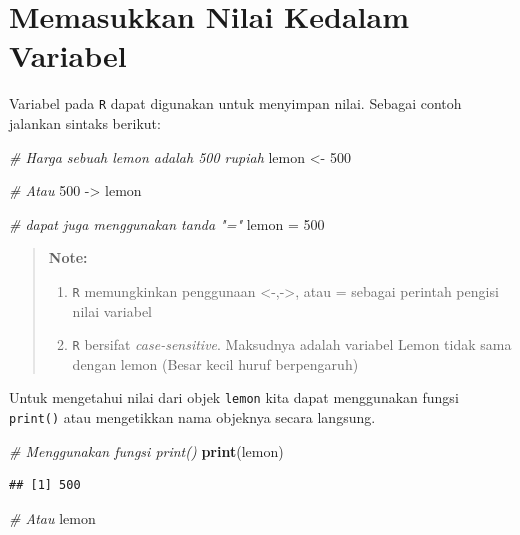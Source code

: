 \documentclass[]{book}
\newenvironment{Shaded}{\begin{snugshade}}{\end{snugshade}}
\newcommand{\KeywordTok}[1]{\textcolor[rgb]{0.13,0.29,0.53}{\textbf{#1}}}
\newcommand{\DecValTok}[1]{\textcolor[rgb]{0.00,0.00,0.81}{#1}}
\newcommand{\StringTok}[1]{\textcolor[rgb]{0.31,0.60,0.02}{#1}}
\newcommand{\CommentTok}[1]{\textcolor[rgb]{0.56,0.35,0.01}{\textit{#1}}}
\newcommand{\NormalTok}[1]{#1}
\begin{document}
\section{Memasukkan Nilai Kedalam
Variabel}\label{memasukkan-nilai-kedalam-variabel}

Variabel pada \texttt{R} dapat digunakan untuk menyimpan nilai. Sebagai
contoh jalankan sintaks berikut:

\begin{Shaded}
\begin{Highlighting}[]
\CommentTok{# Harga sebuah lemon adalah 500 rupiah}
\NormalTok{lemon <-}\StringTok{ }\DecValTok{500}

\CommentTok{# Atau}
\DecValTok{500}\NormalTok{ ->}\StringTok{ }\NormalTok{lemon}

\CommentTok{# dapat juga menggunakan tanda "="}
\NormalTok{lemon =}\StringTok{ }\DecValTok{500}
\end{Highlighting}
\end{Shaded}

\begin{quote}
\textbf{Note: }

\begin{enumerate}
\def\labelenumi{\arabic{enumi}.}
\item
  \texttt{R} memungkinkan penggunaan \textless{}-,-\textgreater{}, atau
  = sebagai perintah pengisi nilai variabel
\item
  \texttt{R} bersifat \emph{case-sensitive}. Maksudnya adalah variabel
  Lemon tidak sama dengan lemon (Besar kecil huruf berpengaruh)
\end{enumerate}
\end{quote}

Untuk mengetahui nilai dari objek \texttt{lemon} kita dapat menggunakan
fungsi \texttt{print()} atau mengetikkan nama objeknya secara langsung.

\begin{Shaded}
\begin{Highlighting}[]
\CommentTok{# Menggunakan fungsi print()}
\KeywordTok{print}\NormalTok{(lemon)}
\end{Highlighting}
\end{Shaded}

\begin{verbatim}
## [1] 500
\end{verbatim}

\begin{Shaded}
\begin{Highlighting}[]
\CommentTok{# Atau}
\NormalTok{lemon}
\end{Highlighting}
\end{Shaded}
\end{document}
